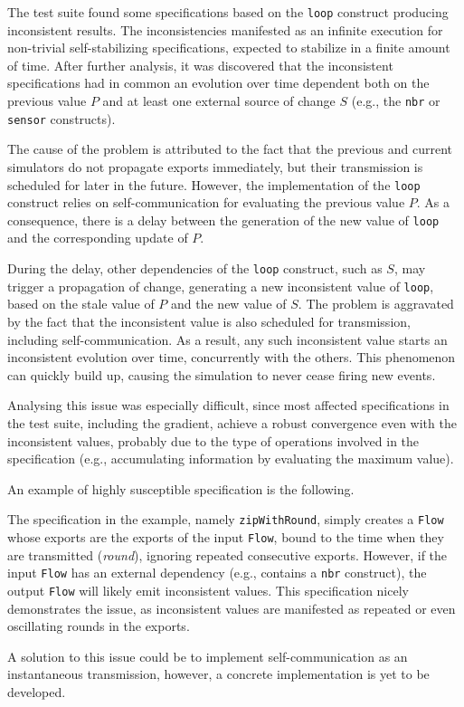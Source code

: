 The test suite found some specifications based on the \texttt{loop} construct
producing inconsistent results. The inconsistencies manifested as an infinite
execution for non-trivial self-stabilizing specifications, expected to
stabilize in a finite amount of time. After further analysis, it was discovered
that the inconsistent specifications had in common an evolution over time
dependent both on the previous value $P$ and at least one external source of
change $S$ (e.g., the \texttt{nbr} or \texttt{sensor} constructs).

The cause of the problem is attributed to the fact that the previous and
current simulators do not propagate exports immediately, but their transmission
is scheduled for later in the future. However, the implementation of the
\texttt{loop} construct relies on self-communication for evaluating the
previous value $P$. As a consequence, there is a delay between the generation
of the new value of \texttt{loop} and the corresponding update of $P$.

During the delay, other dependencies of the \texttt{loop} construct, such as
$S$, may trigger a propagation of change, generating a new inconsistent value
of \texttt{loop}, based on the stale value of $P$ and the new value of $S$. The
problem is aggravated by the fact that the inconsistent value is also scheduled
for transmission, including self-communication. As a result, any such
inconsistent value starts an inconsistent evolution over time, concurrently
with the others. This phenomenon can quickly build up, causing the simulation
to never cease firing new events.

Analysing this issue was especially difficult, since most affected
specifications in the test suite, including the gradient, achieve a robust
convergence even with the inconsistent values, probably due to the type of
operations involved in the specification (e.g., accumulating information by
evaluating the maximum value).

An example of highly susceptible specification is the following.



The specification in the example, namely \texttt{zipWithRound}, simply creates
a \texttt{Flow} whose exports are the exports of the input \texttt{Flow}, bound
to the time when they are transmitted (\textit{round}), ignoring repeated
consecutive exports. However, if the input \texttt{Flow} has an external
dependency (e.g., contains a \texttt{nbr} construct), the output \texttt{Flow}
will likely emit inconsistent values. This specification nicely demonstrates
the issue, as inconsistent values are manifested as repeated or even
oscillating rounds in the exports.

A solution to this issue could be to implement self-communication as an
instantaneous transmission, however, a concrete implementation is yet to be
developed.
